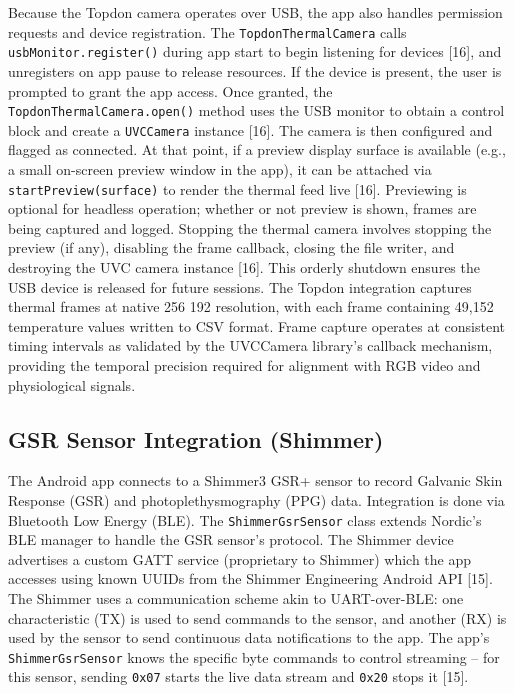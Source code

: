 Because the Topdon camera operates over USB, the app also handles permission requests and device registration. The \texttt{TopdonThermalCamera} calls \texttt{usbMonitor.register()} during app start to begin listening for devices [16], and unregisters on app pause to release resources. If the device is present, the user is prompted to grant the app access. Once granted, the \texttt{TopdonThermalCamera.open()} method uses the USB monitor to obtain a control block and create a \texttt{UVCCamera} instance [16]. The camera is then configured and flagged as connected. At that point, if a preview display surface is available (e.g., a small on-screen preview window in the app), it can be attached via \texttt{startPreview(surface)} to render the thermal feed live [16]. Previewing is optional for headless operation; whether or not preview is shown, frames are being captured and logged. Stopping the thermal camera involves stopping the preview (if any), disabling the frame callback, closing the file writer, and destroying the UVC camera instance [16]. This orderly shutdown ensures the USB device is released for future sessions. The Topdon integration captures thermal frames at native 256\,\texttimes\,192 resolution, with each frame containing 49{,}152 temperature values written to CSV format. Frame capture operates at consistent timing intervals as validated by the UVCCamera library's callback mechanism, providing the temporal precision required for alignment with RGB video and physiological signals.

\subsection{GSR Sensor Integration (Shimmer)}\label{sec:4-2-2}
The Android app connects to a Shimmer3 GSR+ sensor to record Galvanic Skin Response (GSR) and photoplethysmography (PPG) data. Integration is done via Bluetooth Low Energy (BLE). The \texttt{ShimmerGsrSensor} class extends Nordic's BLE manager to handle the GSR sensor's protocol. The Shimmer device advertises a custom GATT service (proprietary to Shimmer) which the app accesses using known UUIDs from the Shimmer Engineering Android API [15]. The Shimmer uses a communication scheme akin to UART-over-BLE: one characteristic (TX) is used to send commands to the sensor, and another (RX) is used by the sensor to send continuous data notifications to the app. The app's \texttt{ShimmerGsrSensor} knows the specific byte commands to control streaming -- for this sensor, sending \texttt{0x07} starts the live data stream and \texttt{0x20} stops it [15].


